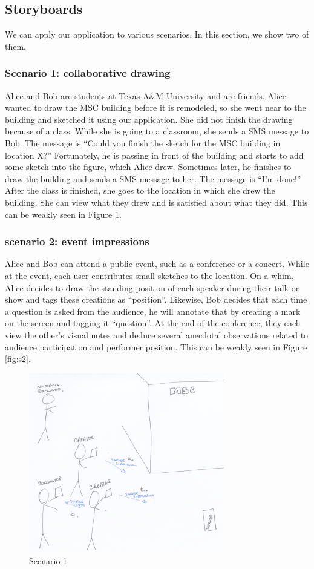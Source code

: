 \documentclass{chi2009}
\begin{document}
\subsection{Storyboards}
We can apply our application to various scenarios. In this section, we show two
of them.

\subsubsection{Scenario 1: collaborative drawing}

Alice and Bob are students at Texas A\&M University and are friends. Alice
wanted to draw the MSC building before it is remodeled, so she went near to the
building and sketched it using our application. She did not finish the drawing
because of a class. While she is going to a classroom, she sends a SMS message
to Bob. The message is ``Could you finish the sketch for the MSC building in
location X?'' Fortunately, he is passing in front of the building and starts to
add some sketch into the figure, which Alice drew. Sometimes later, he finishes
to draw the building and sends a SMS message to her. The message is ``I'm
done!'' After the class is finished, she goes to the location in which she drew
the building. She can view what they drew and is satisfied about what they did.
This can be weakly seen in Figure \ref{fig:s1}.

\subsubsection{scenario 2: event impressions}

Alice and Bob can attend a public event, such as a conference or a concert.
While at the event, each user contributes small sketches to the location.  On a
whim, Alice decides to draw the standing position of each speaker during their
talk or show and tags these creations as ``position''.  Likewise, Bob decides
that each time a question is asked from the audience, he will annotate that by
creating a mark on the screen and tagging it ``question''.  At the end of the
conference, they each view the other's visual notes and deduce several
anecdotal observations related to audience participation and performer
position.  This can be weakly seen in Figure \ref{fig:s2}.

\begin{figure}
\centering
\includegraphics[width=.50\textwidth]{scen1.pdf}
\caption{Scenario 1} \label{fig:s1}
\end{figure}
\end{document}
